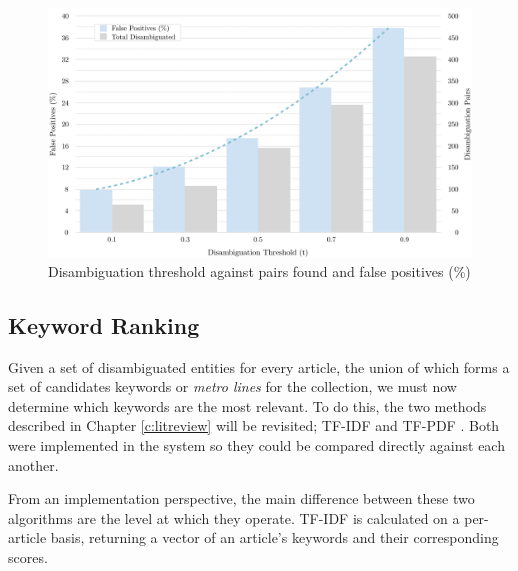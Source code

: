 \begin{figure}[htbp!]
	\centering
	\includegraphics[width=\textwidth]{img/implementation/DisambiguationThreshold.pdf}
	\caption{Disambiguation threshold against pairs found and false positives (\%)}
	\label{fig:dthreshold}
\end{figure}



\subsection{Keyword Ranking}

Given a set of disambiguated entities for every article, the union of which forms a set of candidates keywords or \textit{metro lines} for the collection, we must now determine which keywords are the most relevant. To do this, the two methods described in Chapter \ref{c:litreview} will be revisited; TF-IDF \citep{tfidf} and TF-PDF \citep{TopicExtractionfromnewsArchiveUsingTFPDFAlgorithm}. Both were implemented in the system so they could be compared directly against each another.

From an implementation perspective, the main difference between these two algorithms are the level at which they operate. TF-IDF is calculated on a per-article basis, returning a vector of an article's keywords and their corresponding scores.

%

